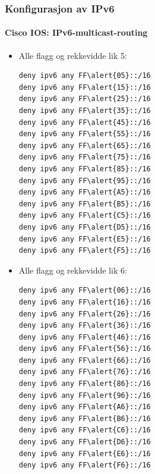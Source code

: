 \begin{frame}[fragile]%
  \frametitle{Konfigurasjon av IPv6}
  \framesubtitle{Cisco IOS: IPv6-multicast-routing}
  \begin{multicols}{2}
    \begin{itemize}%
    \item Alle flagg og rekkevidde lik 5:
\begin{Verbatim}[commandchars=\\\{\},fontsize=\scriptsize]
deny ipv6 any FF\alert{05}::/16
deny ipv6 any FF\alert{15}::/16
deny ipv6 any FF\alert{25}::/16
deny ipv6 any FF\alert{35}::/16
deny ipv6 any FF\alert{45}::/16
deny ipv6 any FF\alert{55}::/16
deny ipv6 any FF\alert{65}::/16
deny ipv6 any FF\alert{75}::/16
deny ipv6 any FF\alert{85}::/16
deny ipv6 any FF\alert{95}::/16
deny ipv6 any FF\alert{A5}::/16
deny ipv6 any FF\alert{B5}::/16
deny ipv6 any FF\alert{C5}::/16
deny ipv6 any FF\alert{D5}::/16
deny ipv6 any FF\alert{E5}::/16
deny ipv6 any FF\alert{F5}::/16
\end{Verbatim}
    \item Alle flagg og rekkevidde lik 6:
\begin{Verbatim}[commandchars=\\\{\},fontsize=\scriptsize]
deny ipv6 any FF\alert{06}::/16
deny ipv6 any FF\alert{16}::/16
deny ipv6 any FF\alert{26}::/16
deny ipv6 any FF\alert{36}::/16
deny ipv6 any FF\alert{46}::/16
deny ipv6 any FF\alert{56}::/16
deny ipv6 any FF\alert{66}::/16
deny ipv6 any FF\alert{76}::/16
deny ipv6 any FF\alert{86}::/16
deny ipv6 any FF\alert{96}::/16
deny ipv6 any FF\alert{A6}::/16
deny ipv6 any FF\alert{B6}::/16
deny ipv6 any FF\alert{C6}::/16
deny ipv6 any FF\alert{D6}::/16
deny ipv6 any FF\alert{E6}::/16
deny ipv6 any FF\alert{F6}::/16
\end{Verbatim}
    \end{itemize}
  \end{multicols}
\end{frame}

